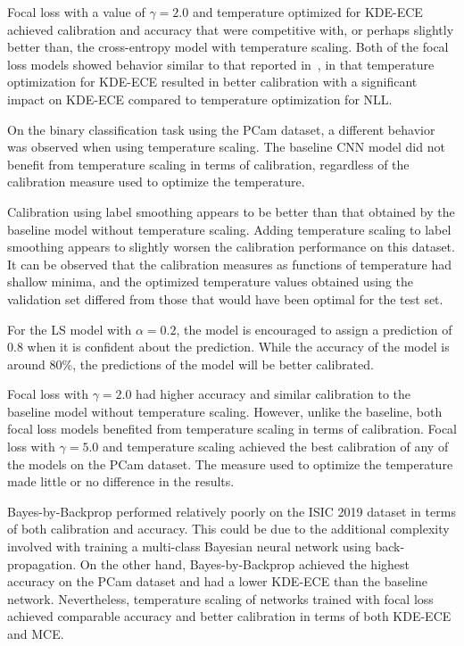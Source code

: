 Focal loss with a value of $\gamma = 2.0$ and temperature optimized for KDE-ECE achieved calibration and accuracy that were competitive with, or perhaps slightly better than, the cross-entropy model with temperature scaling. Both of the focal loss models showed behavior similar to that reported in~\cite{mukhoti2020calibrating}, in that temperature optimization for KDE-ECE resulted in better calibration with a significant impact on KDE-ECE compared to temperature optimization for NLL.

On the binary classification task using the PCam dataset, a different behavior was observed when using temperature scaling. The baseline CNN model did not benefit from temperature scaling in terms of calibration, regardless of the calibration measure used to optimize the temperature.

Calibration using label smoothing appears to be better than that obtained by the baseline model without temperature scaling. Adding temperature scaling to label smoothing appears to slightly worsen the calibration performance on this dataset. It can be observed that the calibration measures as functions of temperature had shallow minima, and the optimized temperature values obtained using the validation set differed from those that would have been optimal for the test set.

For the LS model with $\alpha=0.2$, the model is encouraged to assign a prediction of 0.8 when it is confident about the prediction. While the accuracy of the model is around 80\%, the predictions of the model will be better calibrated.

Focal loss with $\gamma = 2.0$ had higher accuracy and similar calibration to the baseline model without temperature scaling. However, unlike the baseline, both focal loss models benefited from temperature scaling in terms of calibration. Focal loss with $\gamma = 5.0$ and temperature scaling achieved the best calibration of any of the models on the PCam dataset. The measure used to optimize the temperature made little or no difference in the results.

Bayes-by-Backprop performed relatively poorly on the ISIC 2019 dataset in terms of both calibration and accuracy. This could be due to the additional complexity involved with training a multi-class Bayesian neural network using back-propagation. On the other hand, Bayes-by-Backprop achieved the highest accuracy on the PCam dataset and had a lower KDE-ECE than the baseline network. Nevertheless, temperature scaling of networks trained with focal loss achieved comparable accuracy and better calibration in terms of both KDE-ECE and MCE.

